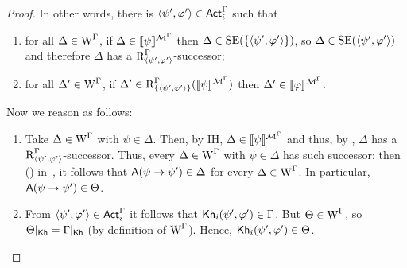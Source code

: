 \begin{proof}
In other words, there is $\langle \psi',\varphi' \rangle \in {\rm \sf Act}^\Gamma_i$ such that
\begin{enumerate}
    \item\label{tlm:cm-esmiv-stexec-lkhi-itm:i} for all $\Delta \in \operatorname{W}^\Gamma$, if $\Delta \in \llbracket \psi \rrbracket^{\mathcal{M}^\Gamma}$ then $\Delta \in \operatorname{SE}(\{ \langle \psi',\varphi' \rangle \})$, so $\Delta \in \operatorname{SE}(\langle \psi',\varphi' \rangle)$ and therefore $\Delta$ has a $\operatorname{R}^\Gamma_{\langle \psi',\varphi' \rangle}$-successor;
    \item\label{tlm:cm-esmiv-stexec-lkhi-itm:ii} for all $\Delta' \in \operatorname{W}^\Gamma$, if $\Delta' \in \operatorname{R}^\Gamma_{\{ \langle \psi',\varphi' \rangle \}}(\llbracket \psi \rrbracket^{\mathcal{M}^\Gamma})$ then $\Delta' \in \llbracket \varphi \rrbracket^{\mathcal{M}^\Gamma}$.
\end{enumerate}
Now we reason as follows:
\begin{enumerate}
    \item Take $\Delta \in \operatorname{W}^\Gamma$ with $\psi \in \Delta$. Then, by IH, $\Delta \in \llbracket \psi \rrbracket^{\mathcal{M}^\Gamma}$ and thus, by , $\Delta$ has a $\operatorname{R}^\Gamma_{\langle \psi',\varphi' \rangle}$-successor.
    Thus, every $\Delta \in \operatorname{W}^\Gamma$ with $\psi \in \Delta$ has such successor; then () in~, it follows that ${\sf A}(\psi \rightarrow \psi') \in \Delta$ for every $\Delta \in \operatorname{W}^\Gamma$.
    In particular, ${\sf A}(\psi \rightarrow \psi') \in \Theta$.

    \item From $\langle \psi',\varphi' \rangle \in {\rm \sf Act}^\Gamma_i$ it follows that ${\sf Kh}_i(\psi',\varphi') \in \Gamma$.
    But $\Theta \in \operatorname{W}^\Gamma$, so $\Theta\vert_{{\sf Kh}} = \Gamma\vert_{{\sf Kh}}$ (by definition of $\operatorname{W}^\Gamma$).
    Hence, ${\sf Kh}_i(\psi',\varphi') \in \Theta$.


\end{enumerate}
\end{proof}
